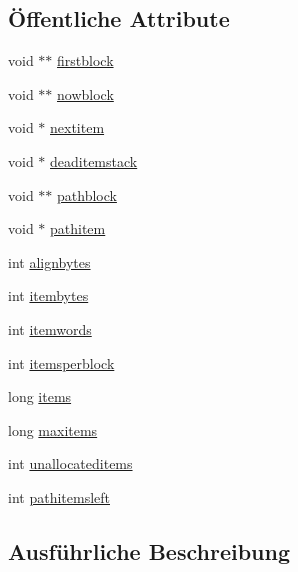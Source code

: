 \subsection*{Öffentliche Attribute}
\begin{DoxyCompactItemize}
\item 
void $\ast$$\ast$ \hyperlink{classtetgenmesh_1_1memorypool_a5a00ffcfb581ef96fb53c995b25838ee}{firstblock}
\item 
void $\ast$$\ast$ \hyperlink{classtetgenmesh_1_1memorypool_a63e80bcff81323ea491bfa189c15879b}{nowblock}
\item 
void $\ast$ \hyperlink{classtetgenmesh_1_1memorypool_ab0864200773e9371db60d190fb0c3cf7}{nextitem}
\item 
void $\ast$ \hyperlink{classtetgenmesh_1_1memorypool_a5979100eaabf64ef2179a259e3adf0b7}{deaditemstack}
\item 
void $\ast$$\ast$ \hyperlink{classtetgenmesh_1_1memorypool_a6830e3c672f7a7546c2ea0ed70b2ac38}{pathblock}
\item 
void $\ast$ \hyperlink{classtetgenmesh_1_1memorypool_a216794c50c477f54c516ca4fad023df1}{pathitem}
\item 
int \hyperlink{classtetgenmesh_1_1memorypool_a83ede6da644205f50ae359dc633a92a5}{alignbytes}
\item 
int \hyperlink{classtetgenmesh_1_1memorypool_adadcd6a22bbdd129b29e1a7a3cc4de43}{itembytes}
\item 
int \hyperlink{classtetgenmesh_1_1memorypool_a11a5e52e6559d7fcd95de844d69a37a4}{itemwords}
\item 
int \hyperlink{classtetgenmesh_1_1memorypool_a06ef9dbd1dec025a8c0475aaac348d3a}{itemsperblock}
\item 
long \hyperlink{classtetgenmesh_1_1memorypool_af29a38b2654a8d977dd24eea8dc72729}{items}
\item 
long \hyperlink{classtetgenmesh_1_1memorypool_ae9dda5bafe91eed206b26fa7d7020716}{maxitems}
\item 
int \hyperlink{classtetgenmesh_1_1memorypool_aa8a5667ab1f55ec7ef852d378871b9ee}{unallocateditems}
\item 
int \hyperlink{classtetgenmesh_1_1memorypool_ad83a51d49f6e03ff38151b870a2f51dd}{pathitemsleft}
\end{DoxyCompactItemize}


\subsection{Ausführliche Beschreibung}


